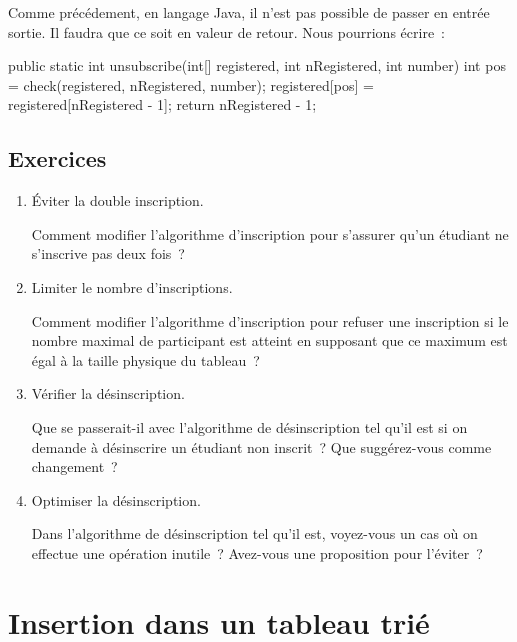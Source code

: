 			Comme précédement, en langage Java, il n'est pas possible de passer
			 en entrée sortie.  Il faudra que ce soit en valeur
			de retour. Nous pourrions écrire~:

			\begin{java}
	public static int unsubscribe(int[] registered, 
			int nRegistered, int number){
		int pos = check(registered, nRegistered, number);
		registered[pos] = registered[nRegistered - 1];
		return nRegistered - 1;
	}
			\end{java}

		\subsection{Exercices}
		
		\begin{enumerate}
			
			\item Éviter la double inscription.

				Comment modifier l’algorithme d’inscription
				pour s’assurer qu’un étudiant ne s’inscrive pas deux fois~?

			\item Limiter le nombre d'inscriptions.

				Comment modifier l’algorithme d’inscription pour refuser une
				inscription si le nombre maximal de participant est atteint en
				supposant que ce maximum est égal à la taille physique du
				tableau~?

			\item Vérifier la désinscription. 

				Que se passerait-il avec l’algorithme
				de désinscription tel qu’il est
				si on demande à désinscrire un étudiant non inscrit~?
				Que suggérez-vous comme changement~?

			\item Optimiser la désinscription.

				Dans l’algorithme de désinscription tel qu’il est,
				voyez-vous un cas où on effectue une opération inutile~?
				Avez-vous une proposition pour l’éviter~?
		
		\end{enumerate}

	\section{Insertion dans un tableau trié} 

